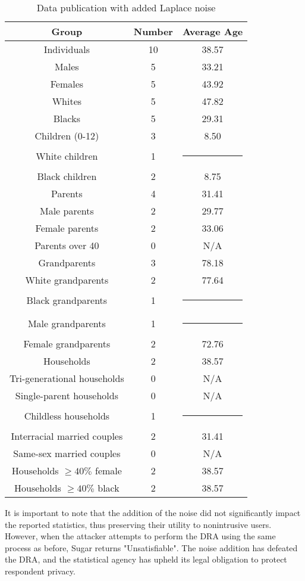 \documentclass[5p,times,11pt]{elsarticle}
\begin{document}
\begin{table}[t]
\begin{tabular}{c|c|c}
Group & Number & Average Age \\
\hline
Individuals & 10 & 38.57 \\
Males & 5 & 33.21 \\
Females & 5 & 43.92 \\
Whites & 5 & 47.82 \\
Blacks & 5 & 29.31 \\
\hline
Children (0-12) & 3 & 8.50 \\
White children & 1 & \multicolumn{1}{c}{\rule{6mm}{3mm}} \\
Black children & 2 & 8.75 \\
\hline
Parents & 4 & 31.41 \\
Male parents & 2 & 29.77 \\
Female parents & 2 & 33.06 \\
Parents over 40 & 0 & N/A \\
\hline
Grandparents & 3 & 78.18 \\
White grandparents & 2 & 77.64 \\
Black grandparents & 1 & \multicolumn{1}{c}{\rule{6mm}{3mm}} \\
Male grandparents & 1 & \multicolumn{1}{c}{\rule{6mm}{3mm}} \\
Female grandparents & 2 & 72.76 \\
\hline
Households & 2 & 38.57 \\
Tri-generational households & 0 & N/A \\
Single-parent households & 0 & N/A \\
Childless households & 1 & \multicolumn{1}{c}{\rule{6mm}{3mm}} \\
Interracial married couples & 2 & 31.41 \\
Same-sex married couples & 0 & N/A \\
Households $\geq 40\% $ female & 2 & 38.57 \\
Households $\geq 40\% $ black & 2 & 38.57 \\

\hline
\end{tabular}
\caption{Data publication with added Laplace noise}\label{publishedstatsnoise}
\end{table}
It is important to note that the addition of the noise did not significantly impact the reported statistics, thus preserving their utility to nonintrusive users. However, when the attacker attempts to perform the DRA using the same process as before, Sugar returns "Unsatisfiable". The noise addition has defeated the DRA, and the statistical agency has upheld its legal obligation to protect respondent privacy.
\end{document}
